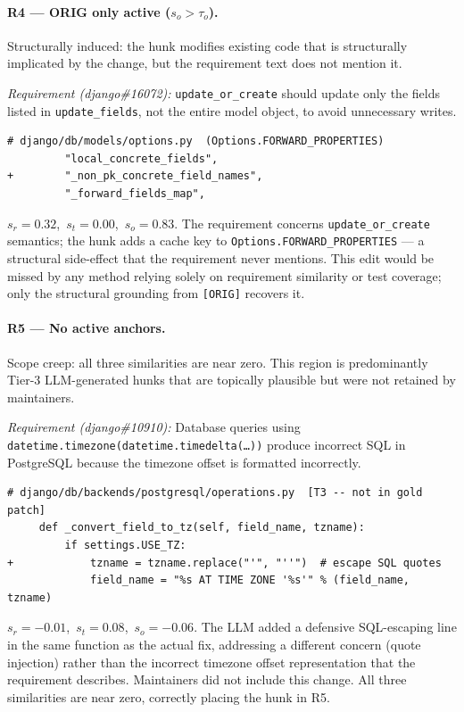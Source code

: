 \paragraph{R4 — ORIG only active \textnormal{($s_o > \tau_o$)}.}
Structurally induced: the hunk modifies existing code that is structurally implicated
by the change, but the requirement text does not mention it.

\smallskip
\noindent\textit{Requirement (django\#16072):}
\texttt{update\_or\_create} should update only the fields listed in
\texttt{update\_fields}, not the entire model object, to avoid unnecessary writes.

\begin{lstlisting}
# django/db/models/options.py  (Options.FORWARD_PROPERTIES)
         "local_concrete_fields",
+        "_non_pk_concrete_field_names",
         "_forward_fields_map",
\end{lstlisting}

\noindent$s_r{=}0.32$,\ $s_t{=}0.00$,\ $s_o{=}0.83$.
The requirement concerns \texttt{update\_or\_create} semantics; the hunk adds a cache
key to \texttt{Options.FORWARD\_PROPERTIES} — a structural side-effect that the
requirement never mentions.
This edit would be missed by any method relying solely on requirement similarity or
test coverage; only the structural grounding from \texttt{[ORIG]} recovers it.

\paragraph{R5 — No active anchors.}
Scope creep: all three similarities are near zero.
This region is predominantly Tier-3 LLM-generated hunks that are topically plausible
but were not retained by maintainers.

\smallskip
\noindent\textit{Requirement (django\#10910):}
Database queries using \texttt{datetime.timezone(datetime.timedelta(\ldots))} produce
incorrect SQL in PostgreSQL because the timezone offset is formatted incorrectly.

\begin{lstlisting}
# django/db/backends/postgresql/operations.py  [T3 -- not in gold patch]
     def _convert_field_to_tz(self, field_name, tzname):
         if settings.USE_TZ:
+            tzname = tzname.replace("'", "''")  # escape SQL quotes
             field_name = "%s AT TIME ZONE '%s'" % (field_name, tzname)
\end{lstlisting}

\noindent$s_r{=}{-}0.01$,\ $s_t{=}0.08$,\ $s_o{=}{-}0.06$.
The LLM added a defensive SQL-escaping line in the same function as the actual fix,
addressing a different concern (quote injection) rather than the incorrect timezone
offset representation that the requirement describes.
Maintainers did not include this change.
All three similarities are near zero, correctly placing the hunk in R5.
